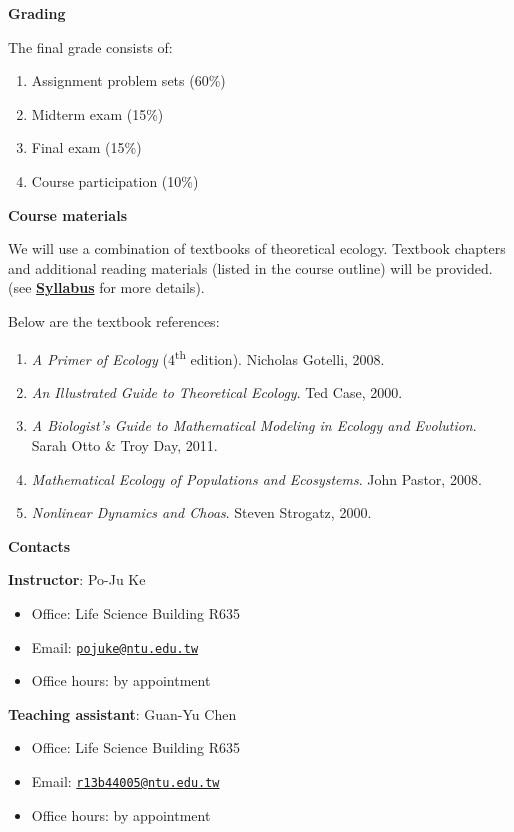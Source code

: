 \documentclass[
]{book}
\providecommand{\tightlist}{%
  \setlength{\itemsep}{0pt}\setlength{\parskip}{0pt}}
\begin{document}
\textbf{Grading}

The final grade consists of:

\begin{enumerate}
\def\labelenumi{(\arabic{enumi})}
\tightlist
\item
  Assignment problem sets (60\%)
\item
  Midterm exam (15\%)
\item
  Final exam (15\%)
\item
  Course participation (10\%)
\end{enumerate}

\textbf{Course materials}

We will use a combination of textbooks of theoretical ecology. Textbook chapters and additional reading materials (listed in the course outline) will be provided. (see \href{https://pojuke.github.io/TheoreticalEcologyPJK/syllabus.html}{\textbf{Syllabus}} for more details).

Below are the textbook references:

\begin{enumerate}
\def\labelenumi{(\arabic{enumi})}
\tightlist
\item
  \emph{A Primer of Ecology} (4\textsuperscript{th} edition). Nicholas Gotelli, 2008.
\item
  \emph{An Illustrated Guide to Theoretical Ecology}. Ted Case, 2000.
\item
  \emph{A Biologist's Guide to Mathematical Modeling in Ecology and Evolution}. Sarah Otto \& Troy Day, 2011.
\item
  \emph{Mathematical Ecology of Populations and Ecosystems}. John Pastor, 2008.
\item
  \emph{Nonlinear Dynamics and Choas}. Steven Strogatz, 2000.
\end{enumerate}

\textbf{Contacts}

\textbf{Instructor}: Po-Ju Ke

\begin{itemize}
\tightlist
\item
  Office: Life Science Building R635
\item
  Email: \href{mailto:pojuke@ntu.edu.tw}{\nolinkurl{pojuke@ntu.edu.tw}}
\item
  Office hours: by appointment
\end{itemize}

\textbf{Teaching assistant}: Guan-Yu Chen

\begin{itemize}
\tightlist
\item
  Office: Life Science Building R635
\item
  Email: \href{mailto:r13b44005@ntu.edu.tw}{\nolinkurl{r13b44005@ntu.edu.tw}}
\item
  Office hours: by appointment
\end{itemize}
\end{document}
